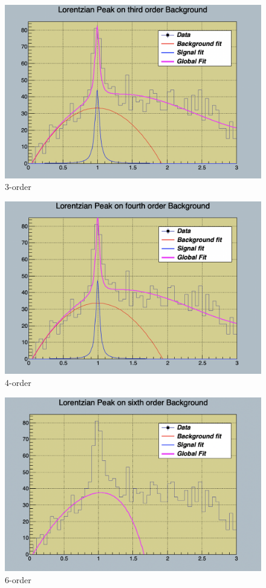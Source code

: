 \documentclass{article}
\begin{document}
\begin{figure}[H]
    \centering
    \includegraphics[scale=0.3]{3-order.png} 
    \caption{3-order}
    \label{fig:graph}
\end{figure}

\begin{figure}[H]
    \centering
    \includegraphics[scale=0.3]{4-order.png} 
    \caption{4-order}
    \label{fig:graph}
\end{figure}

\begin{figure}[H]
    \centering
    \includegraphics[scale=0.3]{6-order.png} 
    \caption{6-order}
    \label{fig:graph}
\end{figure}

  
\end{document}
